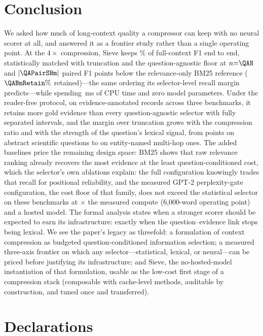 \documentclass[pdflatex,sn-basic]{sn-jnl}
\DeclarePairedDelimiter\abs{\lvert}{\rvert}
\theoremstyle{remark}
\newcommand{\method}{Sieve}
\newcommand{\ms}{\ensuremath{\mathrm{ms}}}
\begin{document}
\section{Conclusion}
\label{sec:conclusion}
We asked how much of long-context quality a compressor can keep with
no neural scorer at all, and answered it as a frontier study rather
than a single operating point. At the $4\times$ compression,
\method{} keeps \QASieRetain\% of full-context F1 end to end,
statistically matched with truncation and the question-agnostic floor
at $n{=}\QAN$ and $\abs{\QAPairSBm}$ paired F1 points below the
relevance-only BM25 reference ($\QABmRetain\%$ retained)---the same
ordering its selector-level recall margin predicts---while
spending \TimeSieSixk\,\ms{} of CPU time and zero model parameters.
Under the reader-free protocol, on \TotalRecords{}
evidence-annotated records across three benchmarks, it retains more
gold evidence than every question-agnostic selector with fully
separated intervals, and the margin over truncation grows with the
compression ratio and with the strength of the question's lexical
signal, from \PairQSH{} points on abstract scientific questions to
\PairHSH{} on entity-named multi-hop ones. The added baselines price
the remaining design space: BM25 shows that raw relevance ranking
already recovers the most evidence at the least
question-conditioned cost, which the selector's own ablations explain:
the full configuration knowingly trades that recall for
positional reliability, and the measured GPT-2 perplexity-gate
configuration, the cost floor of that family, does not exceed the
statistical selector on these benchmarks at
\GateSieRatioSixk$\times$ the measured compute (6{,}000-word operating
point) and a hosted model. The formal analysis states when a stronger
scorer should be expected to earn its infrastructure: exactly when the
question--evidence link stops being lexical. We see the paper's
legacy as threefold: a formulation of context compression as budgeted
question-conditioned information selection; a measured three-axis
frontier on which any selector---statistical, lexical, or neural---can
be priced before justifying its infrastructure; and \method{}, the
no-hosted-model instantiation of that formulation, usable as the
low-cost first stage of a compression stack (composable with
cache-level methods, auditable by construction, and tuned once and
transferred).

\backmatter

\section*{Declarations}
\end{document}
